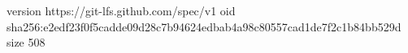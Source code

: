 version https://git-lfs.github.com/spec/v1
oid sha256:e2edf23f0f5cadde09d28c7b94624edbab4a98c80557cad1de7f2c1b84bb529d
size 508
